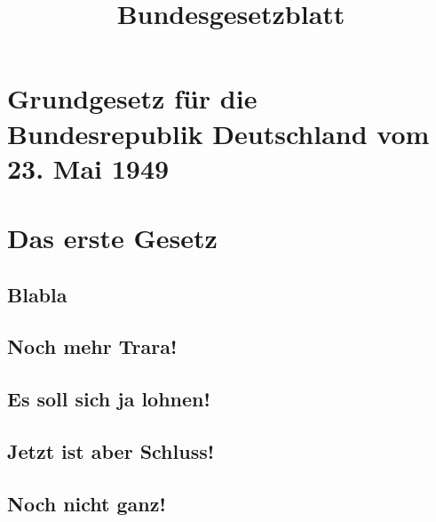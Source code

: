 \documentclass{sasbase}
\begin{document}
\title{Bundesgesetzblatt}

\maketitle

\section{Grundgesetz für die Bundesrepublik Deutschland vom 23. Mai 1949}

\lipsum[1]

\section{Das erste Gesetz}

\lipsum[2]

\subsection{Blabla}

\lipsum[3]

\subsection{Noch mehr Trara!}

\lipsum[4]

\subsection{Es soll sich ja lohnen!}

\lipsum[5]

\subsection{Jetzt ist aber Schluss!}

\lipsum[6]

\subsection{Noch nicht ganz!}

\lipsum[7]
\end{document}
